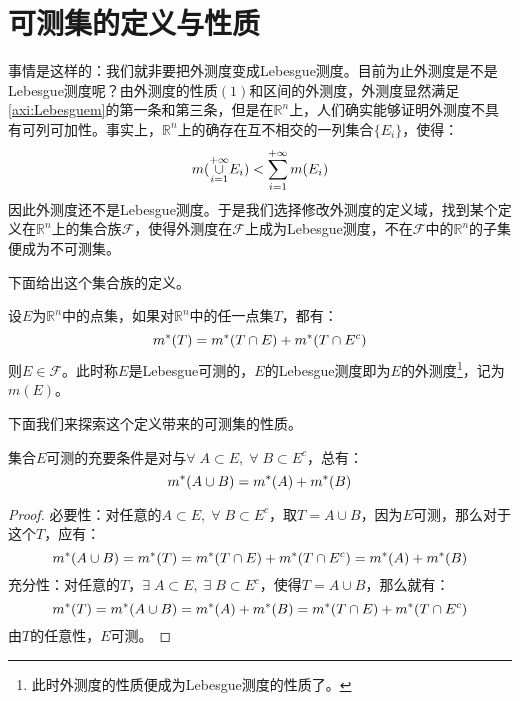 \section{可测集的定义与性质}
事情是这样的：我们就非要把外测度变成Lebesgue测度。目前为止外测度是不是Lebesgue测度呢？由外测度的性质$(1)$和区间的外测度，外测度显然满足\cref{axi:Lebesguem}的第一条和第三条，但是在$\mathbb{R}^n$上，人们确实能够证明外测度不具有可列可加性。事实上，$\mathbb{R}^n$上的确存在互不相交的一列集合$\{E_i\}$，使得：
\begin{equation}
	m(\underset{i=1}{\overset{+\infty}{\cup}}E_i)<\sum\limits_{i=1}^{+\infty} m(E_i)\notag
\end{equation}
因此外测度还不是Lebesgue测度。于是我们选择修改外测度的定义域，找到某个定义在$\mathbb{R}^n$上的集合族$\mathcal{F}$，使得外测度在$\mathcal{F}$上成为Lebesgue测度，不在$\mathcal{F}$中的$\mathbb{R}^n$的子集便成为不可测集。\par
下面给出这个集合族的定义。
\begin{definition}
	设$E$为$\mathbb{R}^n$中的点集，如果对$\mathbb{R}^n$中的任一点集$T$，都有：
	\begin{equation}
		m^*(T)=m^*(T\cap E)+m^*(T\cap E^c)\notag
	\end{equation}
	则$E\in\mathcal{F}$。此时称$E$是Lebesgue可测的，$E$的Lebesgue测度即为$E$的外测度\footnote{此时外测度的性质便成为Lebesgue测度的性质了。}，记为$m(E)$。
\end{definition}
下面我们来探索这个定义带来的可测集的性质。
\begin{lemma}\label{lem:EmeasureAB}
	集合$E$可测的充要条件是对与$\forall\;A\subset E,\;\forall\;B\subset E^c$，总有：
	\begin{equation}
		m^*(A\cup B)=m^*(A)+m^*(B)\notag
	\end{equation}
\end{lemma}
\begin{proof}
	必要性：对任意的$A\subset E,\;\forall\;B\subset E^c$，取$T=A\cup B$，因为$E$可测，那么对于这个$T$，应有：
	\begin{equation}
		m^*(A\cup B)=m^*(T)=m^*(T\cap E)+m^*(T\cap E^c)=m^*(A)+m^*(B)\notag
	\end{equation}
	充分性：对任意的$T$，$\exists\;A\subset E,\;\exists\; B\subset E^c$，使得$T=A\cup B$，那么就有：
	\begin{equation}
		m^*(T)=m^*(A\cup B)=m^*(A)+m^*(B)=m^*(T\cap E)+m^*(T\cap E^c)\notag
	\end{equation}
	由$T$的任意性，$E$可测。
\end{proof}
